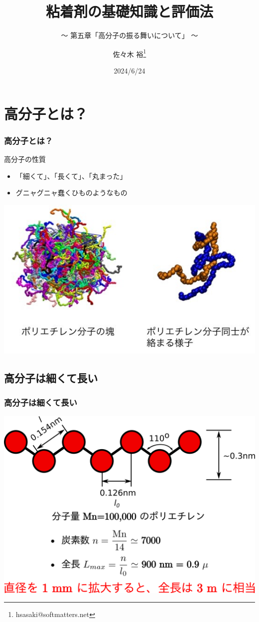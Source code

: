 \documentclass[unicode,12pt]{beamer}%
\title{粘着剤の基礎知識と評価法}
\subtitle{～ 第五章「高分子の振る舞いについて」 ～}
\author[SDL Inc. 佐々木]{佐々木 裕\thanks{hsasaki@softmatters.net}}
\institute[]{元 東亞合成株式会社\\ソフトマターデザインラボ合同会社}
\date{2024/6/24}
\begin{document}
\maketitle

\begin{frame} 
    \tableofcontents[]
\end{frame} 

\section{高分子とは？}
\begin{frame}
	\frametitle{高分子とは？}
		\begin{block}{高分子の性質}
			\begin{itemize}
				\item 「細くて」、「⻑くて」、「丸まった」
				\item グニャグニャ蠢くひものようなもの
			\end{itemize}
		\end{block}
		\centering
		\includegraphics[width=.8\textwidth]{polymer_image.jpg}
\end{frame}

\subsection{高分子は細くて長い}
\begin{frame}
	\frametitle{高分子は細くて長い}
	\centering
	\includegraphics[width=.8\textwidth]{polymer_model.png}
\end{frame}
\end{document}
